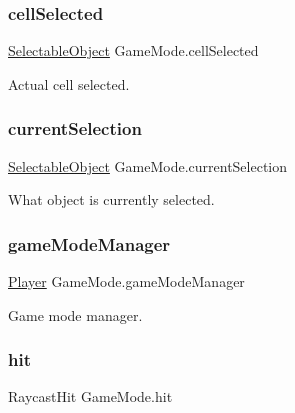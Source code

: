 \subsubsection{\texorpdfstring{cell\+Selected}{cellSelected}}
{\footnotesize\ttfamily \mbox{\hyperlink{class_selectable_object}{Selectable\+Object}} Game\+Mode.\+cell\+Selected\hspace{0.3cm}{\ttfamily [protected]}}



Actual cell selected. 

\mbox{\label{class_game_mode_ae7e1e703236e093aeb97038045c1c2a3}} 
\subsubsection{\texorpdfstring{current\+Selection}{currentSelection}}
{\footnotesize\ttfamily \mbox{\hyperlink{class_selectable_object}{Selectable\+Object}} Game\+Mode.\+current\+Selection\hspace{0.3cm}{\ttfamily [protected]}}



What object is currently selected. 

\mbox{\label{class_game_mode_a5a2348927e4b11e88abaf1d2328eed60}} 
\subsubsection{\texorpdfstring{game\+Mode\+Manager}{gameModeManager}}
{\footnotesize\ttfamily \mbox{\hyperlink{class_player}{Player}} Game\+Mode.\+game\+Mode\+Manager\hspace{0.3cm}{\ttfamily [protected]}}



Game mode manager. 

\mbox{\label{class_game_mode_a5ad1c251d03a0407d064fd581b1119b5}} 
\subsubsection{\texorpdfstring{hit}{hit}}
{\footnotesize\ttfamily Raycast\+Hit Game\+Mode.\+hit\hspace{0.3cm}{\ttfamily [protected]}}



